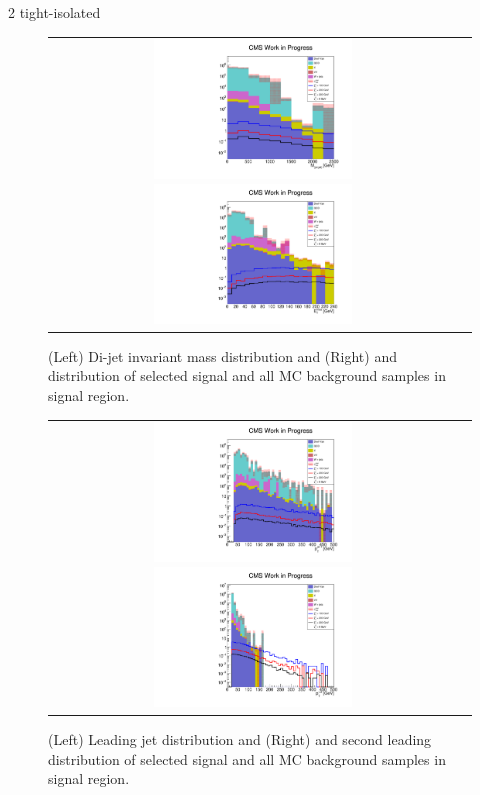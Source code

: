 \FloatBarrier

2 tight-isolated \hadtau

\begin{figure}[tbh!]
	\centering
	\begin{tabular}{cc}
		\includegraphics[width=0.5\textwidth]{analysis/pics/h_dijetinvariantmass_Taui2TightIso.pdf}
		\includegraphics[width=0.5\textwidth]{analysis/pics/h_met_Taui2TightIso.pdf} 		
	\end{tabular}
	\caption{(Left) Di-jet invariant mass distribution and (Right) and \met distribution of selected signal and all MC background samples in signal region.}
	\label{fig::crplots1_Taui2TightIso_13tev}
\end{figure}

\begin{figure}[tbh!]
	\centering
	\begin{tabular}{cc}
		\includegraphics[width=0.5\textwidth]{analysis/pics/h_jet1pt_Taui2TightIso.pdf}
		\includegraphics[width=0.5\textwidth]{analysis/pics/h_tau2pt_Taui2TightIso.pdf} 		
	\end{tabular}
	\caption{(Left) Leading jet \pt distribution and (Right) and second leading \hadtau \pt distribution of selected signal and all MC background samples in signal region.}
	\label{fig::crplots2_Taui2TightIso_13tev}
\end{figure}


